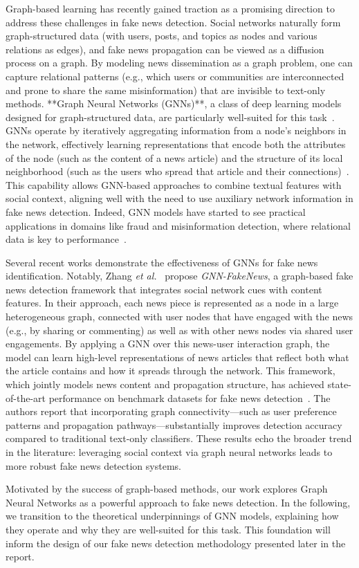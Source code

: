 Graph-based learning has recently gained traction as a promising direction to address these challenges in fake news detection. Social networks naturally form graph-structured data (with users, posts, and topics as nodes and various relations as edges), and fake news propagation can be viewed as a diffusion process on a graph. By modeling news dissemination as a graph problem, one can capture relational patterns (e.g., which users or communities are interconnected and prone to share the same misinformation) that are invisible to text-only methods. **Graph Neural Networks (GNNs)**, a class of deep learning models designed for graph-structured data, are particularly well-suited for this task~\cite{SanchezLengeling2021}. GNNs operate by iteratively aggregating information from a node’s neighbors in the network, effectively learning representations that encode both the attributes of the node (such as the content of a news article) and the structure of its local neighborhood (such as the users who spread that article and their connections)~\cite{SanchezLengeling2021}. This capability allows GNN-based approaches to combine textual features with social context, aligning well with the need to use auxiliary network information in fake news detection. Indeed, GNN models have started to see practical applications in domains like fraud and misinformation detection, where relational data is key to performance~\cite{SanchezLengeling2021}.

Several recent works demonstrate the effectiveness of GNNs for fake news identification. Notably, Zhang \emph{et al.}~\cite{Zhang2024} propose \textit{GNN-FakeNews}, a graph-based fake news detection framework that integrates social network cues with content features. In their approach, each news piece is represented as a node in a large heterogeneous graph, connected with user nodes that have engaged with the news (e.g., by sharing or commenting) as well as with other news nodes via shared user engagements. By applying a GNN over this news-user interaction graph, the model can learn high-level representations of news articles that reflect both what the article contains and how it spreads through the network. This framework, which jointly models news content and propagation structure, has achieved state-of-the-art performance on benchmark datasets for fake news detection~\cite{Zhang2024}. The authors report that incorporating graph connectivity—such as user preference patterns and propagation pathways—substantially improves detection accuracy compared to traditional text-only classifiers. These results echo the broader trend in the literature: leveraging social context via graph neural networks leads to more robust fake news detection systems.

Motivated by the success of graph-based methods, our work explores Graph Neural Networks as a powerful approach to fake news detection. In the following, we transition to the theoretical underpinnings of GNN models, explaining how they operate and why they are well-suited for this task. This foundation will inform the design of our fake news detection methodology presented later in the report.
